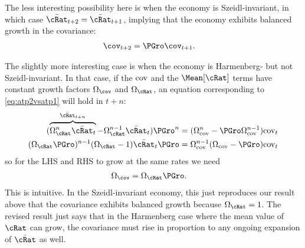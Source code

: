 \documentclass[ProjectDLO]{subfiles}
\begin{document}
The less interesting possibility here is when the economy is Szeidl-invariant, in which case $\bar{\cRat}_{t+2} = \bar{\cRat}_{t+1}$, implying that the economy exhibits balanced growth in the covariance:
\begin{align}
 \cov_{t+2} & = \PGro \cov_{t+1}.
\end{align}

\newcommand{\Grw}{\Omega}

The slightly more interesting case is when the economy is Harmenberg- but not Szeidl-invariant.  In that case, if the $\textup{cov}$ and the $\Mean[\cRat]$ terms have constant growth factors $\Grw_{\cov}$ and $\Grw_{\cRat}$, an equation corresponding to \eqref{eq:atp2vsatp1} will hold in $t+n$:
\begin{align}
  (\overbrace{\Grw_{\cRat}^{n}\bar{\cRat}_{t}}^{\bar{\cRat}_{t+n}}-\Grw^{n-1}_{\cRat}\bar{\cRat}_{t})\PGro^{n} & = (\Grw_{\cv}^{n}-\PGro \Grw_{\cv}^{n-1}) \cv_{t} \notag
\\ (\Grw_{\cRat}\PGro)^{n-1} (\Grw_{\cRat}-1)\bar{\cRat}_{t}\PGro & = \Grw_{\cv}^{n-1}(\Grw_{\cv}-\PGro ) \cv_{t} \label{eq:aRatGrovsCovGronm1}
\end{align}
so for the LHS and RHS to grow at the same rates we need
\begin{align}
 \Grw_{\cov}  & = \Grw_{\cRat}\PGro \label{eq:aRatGrovscovGro}. 
\end{align}
This is intuitive.  In the Szeidl-invariant economy, this just reproduces our result above that the covariance exhibits balanced growth because $\Grw_{\cRat}=1$.  The revised result just says that in the Harmenberg case where the mean value of $\cRat$ can grow, the covariance must rise in proportion to any ongoing expansion of $\bar{\cRat}$ as well.
\end{document}
